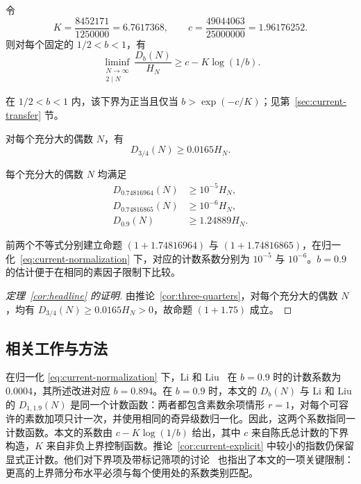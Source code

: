 \begin{theorem}
\label{thm:current-main}
令
\begin{equation}
 K=\frac{8452171}{1250000}=6.7617368,
 \qquad c=\frac{49044063}{25000000}=1.96176252.
 \label{eq:current-safe-constants}
\end{equation}
则对每个固定的 $1/2<b<1$，有
\begin{equation}
 \liminf_{\substack{N\to\infty\\2\mid N}}
      \frac{D_b(N)}{H_N}\ge c-K\log(1/b).
 \label{eq:current-general-theorem}
\end{equation}
\end{theorem}

在 $1/2<b<1$ 内，该下界为正当且仅当 $b>\exp(-c/K)$；见第~\ref{sec:current-transfer} 节。

\begin{corollary}
\label{cor:three-quarters}
对每个充分大的偶数 $N$，有
\[
                  D_{3/4}(N)\ge0.0165H_N.
\]
\end{corollary}

\begin{corollary}
\label{cor:current-explicit}
每个充分大的偶数 $N$ 均满足
\begin{align}
 D_{0.74816964}(N)&\ge10^{-5}H_N,
                                  \label{eq:current-main-count}\\
 D_{0.74816865}(N)&\ge10^{-6}H_N,
                                  \label{eq:current-secondary-count}\\
 D_{0.9}(N)&\ge1.24889H_N.
                                  \label{eq:current-common-exponent}
\end{align}
\end{corollary}

前两个不等式分别建立命题 $(1+1.74816964)$ 与 $(1+1.74816865)$，在归一化~\eqref{eq:current-normalization} 下，对应的计数系数分别为 $10^{-5}$ 与 $10^{-6}$。$b=0.9$ 的估计便于在相同的素因子限制下比较。

\begin{proof}[定理~\ref{cor:headline} 的证明]
由推论~\ref{cor:three-quarters}，对每个充分大的偶数 $N$，均有 $D_{3/4}(N)\ge0.0165H_N>0$，故命题 $(1+1.75)$ 成立。
\end{proof}

\subsection{相关工作与方法}
在归一化 \eqref{eq:current-normalization} 下，Li 和 Liu~\cite[定理~1.1]{LiLiu} 在 $b=0.9$ 时的计数系数为 $0.0004$，其所述改进对应 $b=0.894$。在 $b=0.9$ 时，本文的 $D_b(N)$ 与 Li 和 Liu 的 $D_{1,1.9}(N)$ 是同一个计数函数：两者都包含素数余项情形 $r=1$，对每个可容许的素数加项只计一次，并使用相同的奇异级数归一化。因此，这两个系数指同一计数函数。本文的系数由 $c-K\log(1/b)$ 给出，其中 $c$ 来自陈氏总计数的下界构造，$K$ 来自非负上界控制函数。推论~\ref{cor:current-explicit} 中较小的指数仍保留显式正计数。他们对下界项及带标记筛项的讨论~\cite[第~3 节及第~8.2 节]{LiLiu} 也指出了本文的一项关键限制：更高的上界筛分布水平必须与每个使用处的系数类别匹配。

